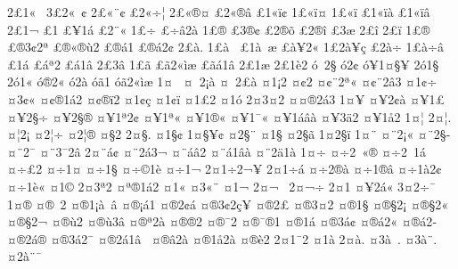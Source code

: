 {2^^a31^^ab^^a0
3^^a32^^ab^^a0^^a2
2^^a3^^ab^^a8^^a2
^^a32^^ab^^f7^^a6
2^^a3^^ab^^ae^^a4
^^a32^^ab^^ae^^e2
^^a31^^ab^^ef^^a2
1^^a3^^ab^^ef^^a4
1^^a3^^ab^^ef^^ad
^^a31^^ab^^ef^^e0
^^a31^^ab^^ef^^e2
2^^a31^^ac
^^a31^^ad
^^a3^^ad^^a51^^e1
^^a32^^ad^^a8^^ab
1^^a3^^ad^^f7
^^a3^^ad^^f7^^e22^^e0
1^^a3^^ad^^ae
^^a33^^ad^^ae^^a2
^^a32^^ad^^ae^^f5
^^a32^^ad^^ae^^ee
^^a33^^ad^^e6
2^^a3^^ad^^ee
2^^a3^^ad^^ef
1^^a3^^ae
^^a3^^ae3^^a22^^aa
^^a3^^ae^^ab^^ae^^f92
^^a3^^ae^^e11
^^a3^^ae^^e12^^a2
2^^a3^^e0.
1^^a3^^e0^^a0
^^a31^^e0^^a0^^e6
^^a3^^e0^^a52^^ab
1^^a32^^e0^^a5^^e7
^^a32^^e0^^f7
1^^a3^^e0^^f7^^e2
^^a31^^e1
^^a3^^e1^^aa2
^^a3^^e11^^e2
2^^a33^^e2
1^^a3^^e3
^^a3^^e32^^ab^^ec^^e6
^^a3^^e3^^e11^^e2
2^^a31^^e6
2^^a31^^e82
^^f3^^a02^^a7
^^f32^^a2
^^f3^^a51^^a4^^a7^^a5
2^^f31^^a7
2^^f31^^ab
^^f3^^ae2^^ab
^^f32^^e0
^^f3^^e31
^^f3^^e32^^ab^^ec^^e6
1^^a4^^a0
^^a4^^a02^^a1^^e0
^^a4^^a02^^a3^^e0
^^a41^^a12
^^a4^^a22
^^a4^^a2^^a82^^aa^^ab
^^a4^^a2^^a82^^e23
^^a41^^a2^^f7
^^a43^^a2^^ab
^^a4^^a2^^ae1^^e12
^^a4^^a2^^ae^^ef2
^^a41^^a2^^e7
^^a41^^a2^^ef
^^a41^^a32
^^a41^^f3
2^^a43^^a42
^^a4^^a4^^ae2^^e13
1^^a4^^a5
^^a4^^a52^^a2^^e0
^^a4^^a51^^a3
^^a4^^a52^^a7^^f7
^^a4^^a52^^a7^^ae
^^a4^^a51^^aa2^^a2
^^a4^^a51^^aa^^ab
^^a4^^a51^^ae^^ab
^^a4^^a51^^af^^ab
^^a4^^a51^^e1^^e2^^e0
^^a4^^a53^^e42
^^a4^^a51^^e52
1^^a4^^a6
2^^a4^^a6.
^^a4^^a62^^a1
^^a42^^a6^^f7
^^a42^^a6^^ae
^^a4^^a72
2^^a4^^a7.
^^a41^^a7^^a2
1^^a4^^a7^^a5^^a2
^^a42^^a7^^a8
^^a41^^a7^^ad
^^a42^^a7^^e3
1^^a42^^a7^^ef
1^^a4^^a8
^^a4^^a82^^a1^^ab
^^a4^^a82^^a7^^ad
^^a4^^a82^^af
^^a4^^a83^^af2^^e2
2^^a4^^a8^^e1^^a2
^^a4^^a82^^e13^^ac
^^a4^^a8^^e1^^e22
^^a4^^a8^^e11^^e2^^e0
^^a4^^a82^^e41^^e0
1^^a4^^f7
^^a4^^f72^^a0^^ab^^ae
^^a4^^f72^^a01^^e1
^^a4^^f7^^a32^^ad
^^a4^^f71^^a4
^^a4^^f71^^a7
^^a4^^f7^^a91^^e8
^^a4^^f71^^ac
2^^a41^^f72^^ac^^a5
2^^a41^^f7^^ad^^e1
^^a4^^f72^^ae^^e0
^^a4^^f71^^ae^^e2
^^a4^^f71^^e02^^a2
^^a4^^f71^^e8^^ab
^^a41^^a9
2^^a43^^aa2
^^a4^^aa^^ae1^^e12
^^a41^^ab
^^a43^^ab^^a8
^^a41^^ac
2^^a4^^ac^^a0
2^^a4^^ac^^f7
2^^a41^^ad
^^a4^^ad^^a52^^e1^^ab
3^^a42^^ad^^f7^^af
1^^a4^^ae
^^a4^^ae^^a02
^^a4^^ae1^^a1^^e0^^a0^^e2
^^a4^^ae^^a1^^e11
^^a4^^ae2^^a2^^e1
^^a4^^ae3^^a22^^e7^^a5
^^a4^^ae2^^a3^^ad
^^a4^^ae3^^a42
^^a4^^ae1^^a7
^^a4^^ae^^a72^^a1
^^a4^^ae^^a72^^ab
^^a4^^ae^^a72^^ac
^^a4^^ae^^f92
^^a4^^ae^^f93^^e2
^^a4^^ae^^aa2^^e0
^^a4^^ae^^ae2
^^a4^^ae^^af2
^^a4^^ae^^af^^ae1
^^a4^^ae1^^e1
^^a4^^ae3^^e1^^a2
^^a4^^ae^^e12^^ab
^^a4^^ae^^e12^^ad
^^a4^^ae2^^e1^^ae
^^a4^^ae3^^e12^^af
^^a4^^ae2^^e11^^e2^^a0^^ad
^^a4^^ae^^e22^^e0
^^a4^^ae1^^e52^^e0
^^a4^^ae^^e82
2^^a41^^af2
^^a41^^e0
2^^a4^^e0.
^^a43^^e0^^a0.
^^a43^^e0^^a8.
^^a42^^e0^^a8^^af
}
